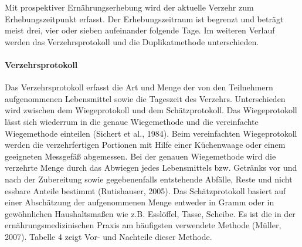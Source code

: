Mit prospektiver Ernährungserhebung wird der aktuelle Verzehr zum Erhebungszeitpunkt erfasst. Der Erhebungszeitraum ist begrenzt und beträgt meist drei, vier oder sieben aufeinander folgende Tage. Im weiteren Verlauf werden das Verzehrsprotokoll und die Duplikatmethode unterschieden. 

\paragraph{Verzehrsprotokoll}

Das Verzehrsprotokoll erfasst die Art und Menge der von den Teilnehmern aufgenommenen Lebensmittel sowie die Tageszeit des Verzehrs. Unterschieden wird zwischen dem Wiegeprotokoll und dem Schätzprotokoll. 
Das Wiegeprotokoll lässt sich wiederrum in die genaue Wiegemethode und die vereinfachte Wiegemethode einteilen (Sichert et al., 1984). Beim vereinfachten Wiegeprotokoll werden die verzehrfertigen Portionen mit Hilfe einer Küchenwaage oder einem geeigneten Messgefäß abgemessen. Bei der genauen Wiegemethode wird die verzehrte Menge durch das Abwiegen jedes Lebensmittels bzw. Getränks vor und nach der Zubereitung sowie gegebenenfalls entstehende Abfälle, Reste und nicht essbare Anteile bestimmt (Rutishauser, 2005). Das Schätzprotokoll basiert auf einer Abschätzung der aufgenommenen Menge entweder in Gramm oder in gewöhnlichen Haushaltsmaßen wie z.B. Esslöffel, Tasse, Scheibe.
Es ist die in der ernährungsmedizinischen Praxis am häufigsten verwendete Methode (Müller, 2007). Tabelle 4 zeigt Vor- und Nachteile dieser Methode.





